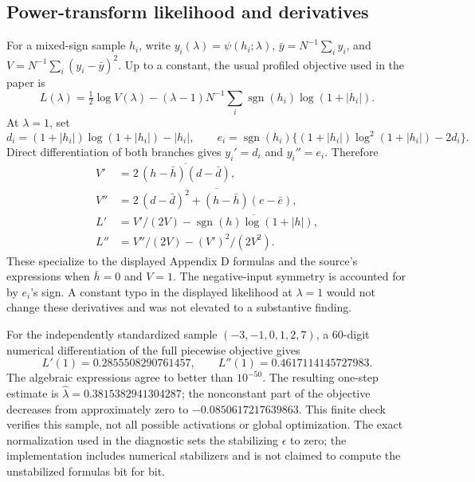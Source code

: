 \documentclass[10pt]{article}
\begin{document}
\subsection*{Power-transform likelihood and derivatives}
For a mixed-sign sample \(h_i\), write \(y_i(\lambda)=\psi(h_i;\lambda)\), \(\bar y=N^{-1}\sum_i y_i\), and \(V=N^{-1}\sum_i(y_i-\bar y)^2\). Up to a constant, the usual profiled objective used in the paper is \[L(\lambda)=\tfrac12\log V(\lambda)
 -(\lambda-1)N^{-1}\sum_i\operatorname{sgn}(h_i)\log(1+|h_i|).\] At \(\lambda=1\), set \[d_i=(1+|h_i|)\log(1+|h_i|)-|h_i|,\qquad
 e_i=\operatorname{sgn}(h_i)\{(1+|h_i|)\log^2(1+|h_i|)-2d_i\}.\] Direct differentiation of both branches gives \(y_i'=d_i\) and \(y_i''=e_i\). Therefore \[\begin{aligned}
 V'&=2\,\overline{(h-\bar h)(d-\bar d)},\\
 V''&=2\,\overline{(d-\bar d)^2+(h-\bar h)(e-\bar e)},\\
 L'&=V'/(2V)-\overline{\operatorname{sgn}(h)\log(1+|h|)},\\
 L''&=V''/(2V)-(V')^2/(2V^2).\end{aligned}\] These specialize to the displayed Appendix D formulas and the source’s expressions when \(\bar h=0\) and \(V=1\). The negative-input symmetry is accounted for by \(e_i\)’s sign. A constant typo in the displayed likelihood at \(\lambda=1\) would not change these derivatives and was not elevated to a substantive finding.\par
For the independently standardized sample \((-3,-1,0,1,2,7)\), a 60-digit numerical differentiation of the full piecewise objective gives \[L'(1)=0.2855508290761457,\qquad
 L''(1)=0.4617114145727983.\] The algebraic expressions agree to better than \(10^{-50}\). The resulting one-step estimate is \(\widehat\lambda=0.3815382941304287\); the nonconstant part of the objective decreases from approximately zero to \(-0.0850617217639863\). This finite check verifies this sample, not all possible activations or global optimization. The exact normalization used in the diagnostic sets the stabilizing \(\epsilon\) to zero; the implementation includes numerical stabilizers and is not claimed to compute the unstabilized formulas bit for bit.\par
\end{document}
